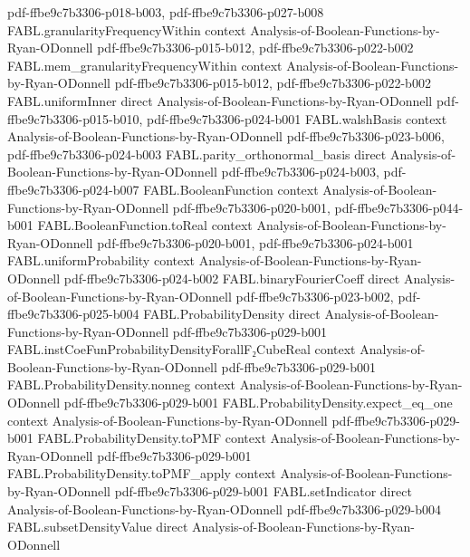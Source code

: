 \begin{theorem}
  {pdf-ffbe9c7b3306-p018-b003,
    pdf-ffbe9c7b3306-p027-b008}
\proofstep
  {FABL.granularityFrequencyWithin}
  {context}
  {Analysis-of-Boolean-Functions-by-Ryan-ODonnell}
  {pdf-ffbe9c7b3306-p015-b012,
    pdf-ffbe9c7b3306-p022-b002}
\proofstep
  {FABL.mem_granularityFrequencyWithin}
  {context}
  {Analysis-of-Boolean-Functions-by-Ryan-ODonnell}
  {pdf-ffbe9c7b3306-p015-b012,
    pdf-ffbe9c7b3306-p022-b002}
\proofstep
  {FABL.uniformInner}
  {direct}
  {Analysis-of-Boolean-Functions-by-Ryan-ODonnell}
  {pdf-ffbe9c7b3306-p015-b010,
    pdf-ffbe9c7b3306-p024-b001}
\proofstep
  {FABL.walshBasis}
  {context}
  {Analysis-of-Boolean-Functions-by-Ryan-ODonnell}
  {pdf-ffbe9c7b3306-p023-b006,
    pdf-ffbe9c7b3306-p024-b003}
\proofstep
  {FABL.parity_orthonormal_basis}
  {direct}
  {Analysis-of-Boolean-Functions-by-Ryan-ODonnell}
  {pdf-ffbe9c7b3306-p024-b003,
    pdf-ffbe9c7b3306-p024-b007}
\proofstep
  {FABL.BooleanFunction}
  {context}
  {Analysis-of-Boolean-Functions-by-Ryan-ODonnell}
  {pdf-ffbe9c7b3306-p020-b001,
    pdf-ffbe9c7b3306-p044-b001}
\proofstep
  {FABL.BooleanFunction.toReal}
  {context}
  {Analysis-of-Boolean-Functions-by-Ryan-ODonnell}
  {pdf-ffbe9c7b3306-p020-b001,
    pdf-ffbe9c7b3306-p024-b001}
\proofstep
  {FABL.uniformProbability}
  {context}
  {Analysis-of-Boolean-Functions-by-Ryan-ODonnell}
  {pdf-ffbe9c7b3306-p024-b002}
\proofstep
  {FABL.binaryFourierCoeff}
  {direct}
  {Analysis-of-Boolean-Functions-by-Ryan-ODonnell}
  {pdf-ffbe9c7b3306-p023-b002,
    pdf-ffbe9c7b3306-p025-b004}
\proofstep
  {FABL.ProbabilityDensity}
  {direct}
  {Analysis-of-Boolean-Functions-by-Ryan-ODonnell}
  {pdf-ffbe9c7b3306-p029-b001}
\proofstep
  {FABL.instCoeFunProbabilityDensityForallF₂CubeReal}
  {context}
  {Analysis-of-Boolean-Functions-by-Ryan-ODonnell}
  {pdf-ffbe9c7b3306-p029-b001}
\proofstep
  {FABL.ProbabilityDensity.nonneg}
  {context}
  {Analysis-of-Boolean-Functions-by-Ryan-ODonnell}
  {pdf-ffbe9c7b3306-p029-b001}
\proofstep
  {FABL.ProbabilityDensity.expect_eq_one}
  {context}
  {Analysis-of-Boolean-Functions-by-Ryan-ODonnell}
  {pdf-ffbe9c7b3306-p029-b001}
\proofstep
  {FABL.ProbabilityDensity.toPMF}
  {context}
  {Analysis-of-Boolean-Functions-by-Ryan-ODonnell}
  {pdf-ffbe9c7b3306-p029-b001}
\proofstep
  {FABL.ProbabilityDensity.toPMF_apply}
  {context}
  {Analysis-of-Boolean-Functions-by-Ryan-ODonnell}
  {pdf-ffbe9c7b3306-p029-b001}
\proofstep
  {FABL.setIndicator}
  {direct}
  {Analysis-of-Boolean-Functions-by-Ryan-ODonnell}
  {pdf-ffbe9c7b3306-p029-b004}
\proofstep
  {FABL.subsetDensityValue}
  {direct}
  {Analysis-of-Boolean-Functions-by-Ryan-ODonnell}

\end{theorem}
